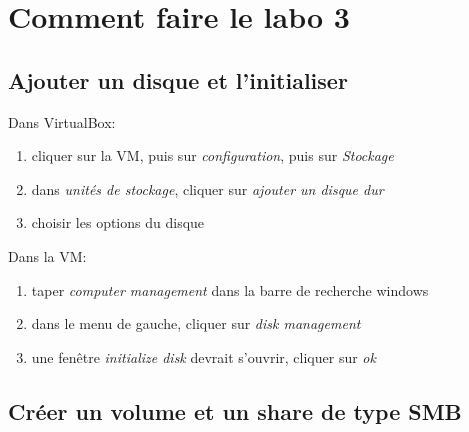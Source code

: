 \documentclass[a4paper]{article}
\begin{document}
\section{Comment faire le labo 3}





\subsection{Ajouter un disque et l'initialiser}



Dans VirtualBox:
\begin{enumerate}
    \item cliquer sur la VM, puis sur \textit{configuration}, puis sur \textit{Stockage}
    \item dans \textit{unités de stockage}, cliquer sur \textit{ajouter un disque dur}
    \item choisir les options du disque
\end{enumerate}
Dans la VM:
\begin{enumerate}
    \item taper \textit{computer management} dans la barre de recherche windows
    \item dans le menu de gauche, cliquer sur \textit{disk management}
    \item une fenêtre \textit{initialize disk} devrait s'ouvrir, cliquer sur \textit{ok}
\end{enumerate}





\subsection{Créer un volume et un share de type SMB}
\end{document}
